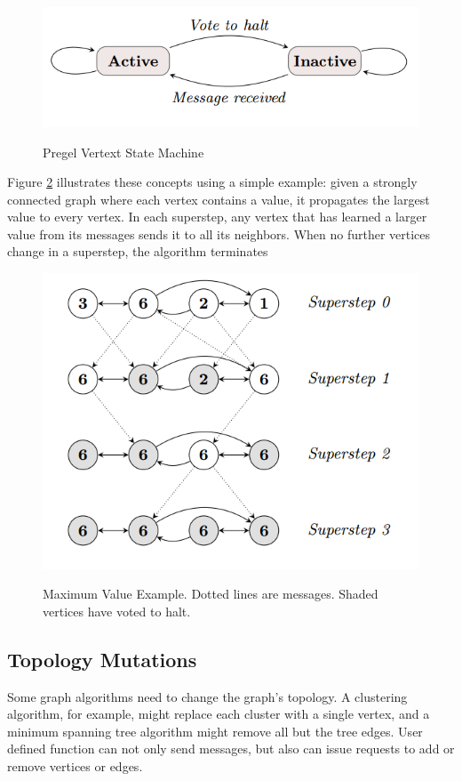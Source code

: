 \documentclass {article}
\begin{document}
\begin{figure}
  \centering
  \includegraphics[width=\textwidth]{pregel_vertext_machine.PNG}\\
  \caption{Pregel Vertext State Machine}\label{SMachine}
\end{figure}

Figure \ref{pregel_max} illustrates these concepts using a simple example:
given a strongly connected graph where each vertex contains
a value, it propagates the largest value to every vertex. In
each superstep, any vertex that has learned a larger value
from its messages sends it to all its neighbors. When no
further vertices change in a superstep, the algorithm terminates
\begin{figure}
  \centering
  \includegraphics[width=\textwidth]{pregel_max_example.PNG}\\
  \caption{Maximum Value Example. Dotted lines
are messages. Shaded vertices have voted to halt.}\label{pregel_max}
\end{figure}


\subsection{Topology Mutations}
Some graph algorithms need to change the graph's topology. A clustering algorithm, for example, might replace each
cluster with a single vertex, and a minimum spanning tree
algorithm might remove all but the tree edges. User defined function can not only send messages, but also can
issue requests to add or remove vertices or edges.
\end{document}
